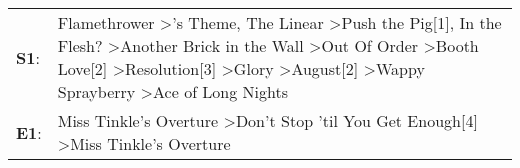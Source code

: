 \begin{supertabular}{p{0.03\textwidth}p{0.92\textwidth}}
 \textbf{S1}:  &  Flamethrower\textsuperscript{} \textgreater {}'s Theme\textsuperscript{}, \enspace The Linear\textsuperscript{} \textgreater \enspace Push the Pig[1]\textsuperscript{}, \enspace In the Flesh?\textsuperscript{} \textgreater \enspace Another Brick in the Wall\textsuperscript{} \textgreater \enspace Out Of Order\textsuperscript{} \textgreater \enspace Booth Love[2]\textsuperscript{} \textgreater \enspace Resolution[3]\textsuperscript{} \textgreater \enspace Glory\textsuperscript{} \textgreater \enspace August[2]\textsuperscript{} \textgreater \enspace Wappy Sprayberry\textsuperscript{} \textgreater \enspace Ace of Long Nights\textsuperscript{}  \enspace  \\
 \textbf{E1}:  &                                                                                                                                                                                                                                                                                                                                                                                                                                                                                                  Miss Tinkle's Overture\textsuperscript{} \textgreater \enspace Don't Stop 'til You Get Enough[4]\textsuperscript{} \textgreater \enspace Miss Tinkle's Overture\textsuperscript{}  \enspace  \\
\end{supertabular}
